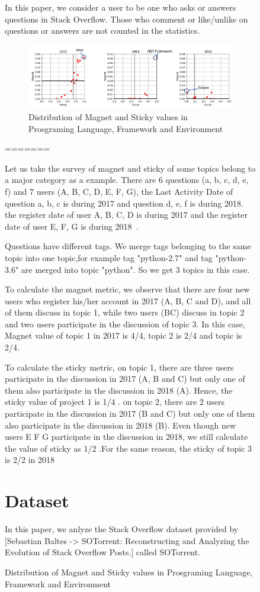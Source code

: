 \documentclass[conference]{IEEEtran}
\begin{document}
\begin{figure}[t]
In this paper, we consider a user to be one who asks or answers questions in Stack Overflow. Those who comment or like/unlike on questions or answers are not counted in the statistics.

\begin{figure}[t]
 \centering
 \includegraphics[width=0.7\hsize]{img/2010all.pdf}  
 \caption{Distribution of Magnet and Sticky values in Prosgraming Language, Framework and Environment} 
 \label{fig:2010} 
\end{figure}
\smallskip
=======
\smallskip

Let us take the survey of magnet and sticky of some topics belong to a major category as a example. There are 6 questions (a, b, c, d, e, f) and 7 users (A, B, C, D, E, F, G), the Last Activity Date of question a, b, c is during 2017 and question d, e, f is during 2018. the register date of user A, B, C, D is during 2017 and the register date of user E, F, G is during 2018~\cite{yamashita2016magnet}.

Questions have different tags. We merge tags belonging to the same topic into one topic,for example tag "python-2.7" and tag "python-3.6" are merged into topic "python". So we get 3 topics in this case.

To calculate the magnet metric, we observe that there are four new users who register his/her account in 2017 (A, B, C and D), and all of them discuss in topic 1, while two users (BC) discuss in topic 2 and two users participate in the discussion of topic 3. In this case, Magnet value of topic 1 in 2017 is 4/4, topic 2 is 2/4 and topic is 2/4.

To calculate the sticky metric, on topic 1, there are three users participate in the discussion in 2017 (A, B and C) but only one of them also participate in the discussion in 2018 (A). Hence, the sticky value of project 1 is 1/4 . on topic 2, there are 2 users participate in the discussion in 2017 (B and C) but only one of them also participate in the discussion in 2018 (B). Even though new users E F G participate in the discussion in 2018, we still calculate the value of sticky as 1/2 .For the same reason, the sticky of topic 3 is 2/2 in {2018}


\section{Dataset}
In this paper, we anlyze the Stack Overflow dataset provided by [Sebastian Baltes -> SOTorrent: Reconstructing and Analyzing the Evolution of Stack Overflow Posts.] called SOTorrent. 


\end{figure}
\end{document}
